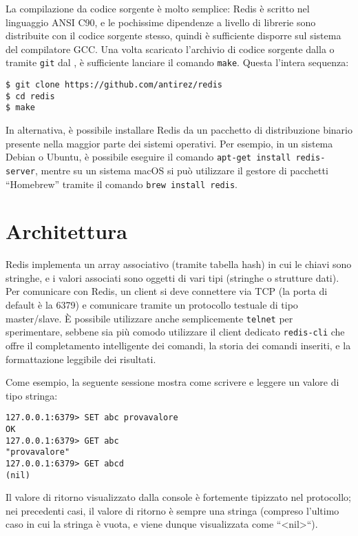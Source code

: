 La compilazione da codice sorgente è molto semplice: Redis è scritto nel linguaggio
ANSI C90, e le pochissime dipendenze a livello di librerie sono distribuite con il
codice sorgente stesso, quindi è sufficiente disporre sul sistema del compilatore GCC.
Una volta scaricato l'archivio di codice sorgente dalla \cite{pagina di scaricamento ufficiale}
o tramite \verb|git| dal \cite{repositorio ufficiale su GitHub}, è sufficiente lanciare il
comando \verb|make|. Questa l'intera sequenza:

\medskip
\begin{lstlisting}
$ git clone https://github.com/antirez/redis
$ cd redis
$ make
\end{lstlisting}

In alternativa, è possibile installare Redis da un pacchetto di distribuzione binario
presente nella maggior parte dei sistemi operativi. Per esempio, in un sistema Debian
o Ubuntu, è possibile eseguire il comando \verb|apt-get install redis-server|, mentre
su un sistema macOS si può utilizzare il gestore di pacchetti ``Homebrew'' tramite il
comando \verb|brew install redis|.

\section{Architettura}

Redis implementa un array associativo (tramite tabella hash) in cui le chiavi sono
stringhe, e i valori associati sono oggetti di vari tipi (stringhe o strutture dati).
Per comunicare con Redis, un client si deve connettere via TCP (la porta di default è la 6379) e
comunicare tramite un protocollo testuale di tipo master/slave. È possibile utilizzare
anche semplicemente \verb|telnet| per sperimentare, sebbene sia più comodo utilizzare il
client dedicato \verb|redis-cli| che offre il completamento intelligente dei comandi, la
storia dei comandi inseriti, e la formattazione leggibile dei risultati.

Come esempio, la seguente sessione mostra come scrivere e leggere un valore di tipo
stringa:

\medskip
\begin{lstlisting}
127.0.0.1:6379> SET abc provavalore
OK
127.0.0.1:6379> GET abc
"provavalore"
127.0.0.1:6379> GET abcd
(nil)
\end{lstlisting}

Il valore di ritorno visualizzato dalla console è fortemente tipizzato nel protocollo;
nei precedenti casi, il valore di ritorno è sempre una stringa (compreso l'ultimo
caso in cui la stringa è vuota, e viene dunque visualizzata come ``<nil>``).

